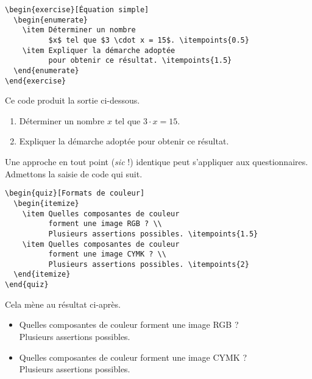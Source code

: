 \documentclass[
  twocolumn,%
  fontsize=9pt,%
  DIV=calc,%
  numbers=noendperiod%
]{scrartcl}
\begin{document}
\begin{lstlisting}
\begin{exercise}[Équation simple]
  \begin{enumerate}
    \item Déterminer un nombre 
          $x$ tel que $3 \cdot x = 15$. \itempoints{0.5}
    \item Expliquer la démarche adoptée
          pour obtenir ce résultat. \itempoints{1.5}
  \end{enumerate}
\end{exercise} 
\end{lstlisting}
Ce code produit la sortie ci-dessous.

\begin{exercise}
  \begin{enumerate}
    \item Déterminer un nombre $x$ tel que $3 \cdot x = 15$. 
    \item Expliquer la démarche adoptée pour obtenir ce résultat. 
  \end{enumerate}
\end{exercise}

Une approche en tout point (\textit{sic} !) identique peut s'appliquer aux questionnaires. Admettons la saisie de code qui suit.

\begin{lstlisting}
\begin{quiz}[Formats de couleur]
  \begin{itemize}
    \item Quelles composantes de couleur 
          forment une image RGB ? \\ 
          Plusieurs assertions possibles. \itempoints{1.5}
    \item Quelles composantes de couleur 
          forment une image CYMK ? \\
          Plusieurs assertions possibles. \itempoints{2}
  \end{itemize}
\end{quiz}
\end{lstlisting}
Cela mène au résultat ci-après.

\begin{quiz}
  \begin{itemize}
    \item Quelles composantes de couleur 
          forment une image RGB ? \\ 
          Plusieurs assertions possibles. 
    \item Quelles composantes de couleur 
          forment une image CYMK ? \\
          Plusieurs assertions possibles. 
  \end{itemize}
\end{quiz}
\end{document}
